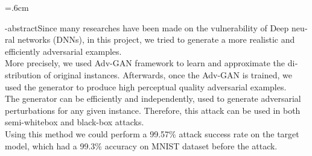 
\baselineskip=.6cm
\begin{latin}

\en-abstract{Since many researches have been made on the vulnerability of 	Deep neural networks (DNNs), in this project, we tried to generate a more realistic and efficiently adversarial examples.
	 \\
	 More precisely, we used Adv-GAN framework to learn and approximate the distribution of original instances. Afterwards, once the Adv-GAN is trained, we used the generator to produce high perceptual quality adversarial examples. 
	 \\
	 The generator can be efficiently and independently, used to generate adversarial perturbations for any given instance. Therefore, this attack can be used in both semi-whitebox and black-box attacks.
	 \\
	 Using this method we could perform a 99.57\% attack success rate on the target model, which had a 99.3\% accuracy on MNIST dataset before the attack. 
}
\latinfirstPage
\end{latin}
